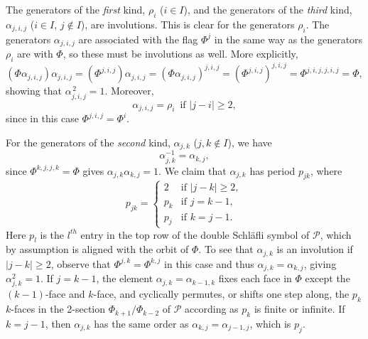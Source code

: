 \documentclass[12pt]{article}
\renewcommand{\>}{\rangle}
\renewcommand{\geq}{\geqslant}
\theoremstyle{definition}\newtheorem{definition}{Definition}[section]
\begin{document}
The generators of the {\it first\/} kind, $\rho_i$ ($i \in I$), and the generators of the {\it third\/} kind, $\alpha_{j,i,j}$ ($i \in I$, $j \notin I$), are involutions. This is clear for the generators $\rho_i$. The generators $\alpha_{j,i,j}$ are associated with the flag $\Phi^j$ in the same way as the generators $\rho_i$ are with $\Phi$, so these must be involutions as well. More explicitly, 
\[ (\Phi\alpha_{j,i,j})\alpha_{j,i,j}=(\Phi^{j,i,j})\alpha_{j,i,j}
=(\Phi\alpha_{j,i,j})^{j,i,j}=(\Phi^{j,i,j})^{j,i,j} = \Phi^{j,i,j,j,i,j}=\Phi,\]
showing that $\alpha_{j,i,j}^{\,2}=1$. Moreover,   
\begin{equation}
\label{alphrho}
\alpha_{j,i,j} = \rho_i\,\mbox{ if } | j - i | \geq 2,
\end{equation}
since in this case $\Phi^{j,i,j}=\Phi^i$. 

For the generators of the {\it second\/} kind, $\alpha_{j,k}$ ($j, k\notin I$), we have 
\begin{equation} 
\label{invalphajk}
\alpha^{-1}_{j,k}= \alpha_{k,j},
\end{equation}
since $\Phi^{k,j,j,k}=\Phi$ gives $\alpha_{j,k}\alpha_{k,j}=1$. We claim that $\alpha_{j,k}$ has period $p_{jk}$, where 
\[p_{jk}=
\left\{\begin{array}{ll}
2   &\mbox{if } |j-k|\geq 2,\\
p_k&\mbox{if } j=k-1,\\
p_j&\mbox{if } k=j-1.
\end{array}
\right.\]
Here $p_l$ is the $l^{th}$ entry in the top row of the double Schl\"afli symbol of $\mathcal{P}$, which by assumption is aligned with the orbit of $\Phi$. To see that $\alpha_{j,k}$ is an involution if $|j-k| \geq 2$, observe that $\Phi^{j,k}=\Phi^{k,j}$ in this case and thus $\alpha_{j,k}=\alpha_{k,j}$, giving $\alpha_{j,k}^{2}=1$. If $j=k-1$, the element $\alpha_{j,k}=\alpha_{k-1,k}$ fixes each face in $\Phi$ except the $(k-1)$-face and $k$-face, and cyclically permutes, or shifts one step along, the $p_k$ $k$-faces in the 2-section $\Phi_{k+1}/\Phi_{k-2}$ of $\mathcal{P}$ according as $p_k$ is finite or infinite. If $k=j-1$, then $\alpha_{j,k}$ has the same order as $\alpha_{k,j}=\alpha_{j-1,j}$, which is $p_j$.
\end{document}
